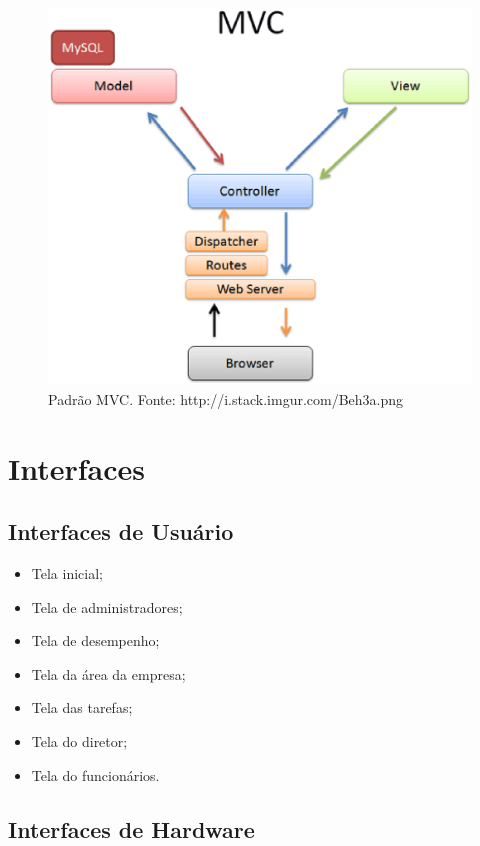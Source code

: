 \begin{figure}[htb]
	\centering
	\label{figura_mvc}
		\includegraphics[keepaspectratio=true,scale=0.6]{figuras/MVC.eps}
	\caption{Padrão MVC. Fonte: http://i.stack.imgur.com/Beh3a.png}
\end{figure}

\clearpage{}

\section{Interfaces}

\subsection{Interfaces de Usuário}

\begin{itemize}
  \item{Tela inicial;}
  \item{Tela de administradores;}
  \item{Tela de desempenho;}
  \item{Tela da área da empresa;}
  \item{Tela das tarefas;}
  \item{Tela do diretor;}
  \item{Tela do funcionários.}
\end{itemize}


\subsection{Interfaces de Hardware}

